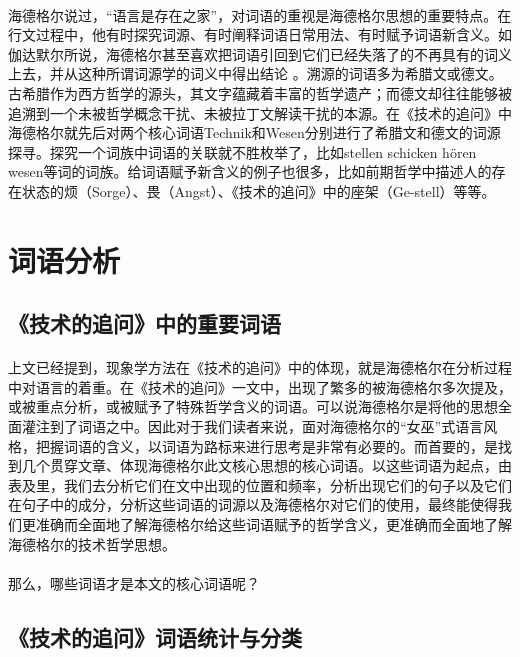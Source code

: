 \documentclass{article}
\begin{document}
		\paragraph{}
		海德格尔说过，“语言是存在之家”，对词语的重视是海德格尔思想的重要特点。在行文过程中，他有时探究词源、有时阐释词语日常用法、有时赋予词语新含义。如伽达默尔所说，海德格尔甚至喜欢把词语引回到它们已经失落了的不再具有的词义上去，并从这种所谓词源学的词义中得出结论
\cite{Deonstr_DeFr}。溯源的词语多为希腊文或德文。古希腊作为西方哲学的源头，其文字蕴藏着丰富的哲学遗产；而德文却往往能够被追溯到一个未被哲学概念干扰、未被拉丁文解读干扰的本源。在《技术的追问》中海德格尔就先后对两个核心词语Technik和Wesen分别进行了希腊文和德文的词源探寻。探究一个词族中词语的关联就不胜枚举了，比如stellen schicken hören wesen等词的词族。给词语赋予新含义的例子也很多，比如前期哲学中描述人的存在状态的烦（Sorge）、畏（Angst）、《技术的追问》中的座架（Ge-stell）等等。
\section{词语分析}
	\subsection{《技术的追问》中的重要词语}
		\paragraph{}
		上文已经提到，现象学方法在《技术的追问》中的体现，就是海德格尔在分析过程中对语言的着重。在《技术的追问》一文中，出现了繁多的被海德格尔多次提及，或被重点分析，或被赋予了特殊哲学含义的词语。可以说海德格尔是将他的思想全面灌注到了词语之中。因此对于我们读者来说，面对海德格尔的“女巫”式语言风格，把握词语的含义，以词语为路标来进行思考是非常有必要的。而首要的，是找到几个贯穿文章、体现海德格尔此文核心思想的核心词语。以这些词语为起点，由表及里，我们去分析它们在文中出现的位置和频率，分析出现它们的句子以及它们在句子中的成分，分析这些词语的词源以及海德格尔对它们的使用，最终能使得我们更准确而全面地了解海德格尔给这些词语赋予的哲学含义，更准确而全面地了解海德格尔的技术哲学思想。
		\paragraph{}
		那么，哪些词语才是本文的核心词语呢？
		\paragraph{}
		
	\subsection{《技术的追问》词语统计与分类}
\end{document}
